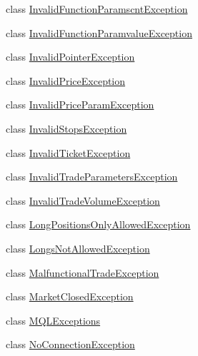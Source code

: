 \begin{DoxyCompactItemize}
\item 
class \hyperlink{class_m_q_l4_c_sharp_1_1_base_1_1_exceptions_1_1_invalid_function_paramscnt_exception}{Invalid\+Function\+Paramscnt\+Exception}
\item 
class \hyperlink{class_m_q_l4_c_sharp_1_1_base_1_1_exceptions_1_1_invalid_function_paramvalue_exception}{Invalid\+Function\+Paramvalue\+Exception}
\item 
class \hyperlink{class_m_q_l4_c_sharp_1_1_base_1_1_exceptions_1_1_invalid_pointer_exception}{Invalid\+Pointer\+Exception}
\item 
class \hyperlink{class_m_q_l4_c_sharp_1_1_base_1_1_exceptions_1_1_invalid_price_exception}{Invalid\+Price\+Exception}
\item 
class \hyperlink{class_m_q_l4_c_sharp_1_1_base_1_1_exceptions_1_1_invalid_price_param_exception}{Invalid\+Price\+Param\+Exception}
\item 
class \hyperlink{class_m_q_l4_c_sharp_1_1_base_1_1_exceptions_1_1_invalid_stops_exception}{Invalid\+Stops\+Exception}
\item 
class \hyperlink{class_m_q_l4_c_sharp_1_1_base_1_1_exceptions_1_1_invalid_ticket_exception}{Invalid\+Ticket\+Exception}
\item 
class \hyperlink{class_m_q_l4_c_sharp_1_1_base_1_1_exceptions_1_1_invalid_trade_parameters_exception}{Invalid\+Trade\+Parameters\+Exception}
\item 
class \hyperlink{class_m_q_l4_c_sharp_1_1_base_1_1_exceptions_1_1_invalid_trade_volume_exception}{Invalid\+Trade\+Volume\+Exception}
\item 
class \hyperlink{class_m_q_l4_c_sharp_1_1_base_1_1_exceptions_1_1_long_positions_only_allowed_exception}{Long\+Positions\+Only\+Allowed\+Exception}
\item 
class \hyperlink{class_m_q_l4_c_sharp_1_1_base_1_1_exceptions_1_1_longs_not_allowed_exception}{Longs\+Not\+Allowed\+Exception}
\item 
class \hyperlink{class_m_q_l4_c_sharp_1_1_base_1_1_exceptions_1_1_malfunctional_trade_exception}{Malfunctional\+Trade\+Exception}
\item 
class \hyperlink{class_m_q_l4_c_sharp_1_1_base_1_1_exceptions_1_1_market_closed_exception}{Market\+Closed\+Exception}
\item 
class \hyperlink{class_m_q_l4_c_sharp_1_1_base_1_1_exceptions_1_1_m_q_l_exceptions}{M\+Q\+L\+Exceptions}
\item 
class \hyperlink{class_m_q_l4_c_sharp_1_1_base_1_1_exceptions_1_1_no_connection_exception}{No\+Connection\+Exception}

\end{DoxyCompactItemize}
